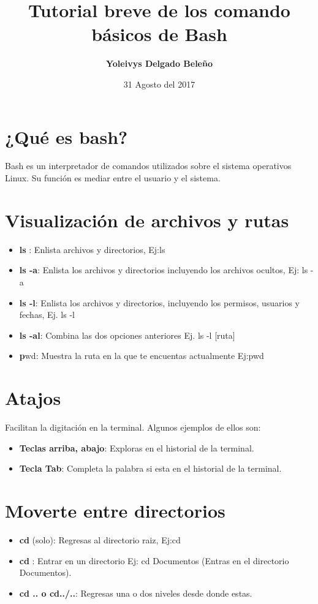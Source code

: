 \documentclass[12pt,a4paper]{article}
\author{\textbf{Yoleivys Delgado Beleño}}
\date{31 Agosto del 2017}
\title{\textbf{Tutorial breve de los comando básicos de Bash}}
\begin{document}
\maketitle



\section{¿Qué es bash?}
Bash es un interpretador de comandos utilizados sobre el sistema operativos Linux. Su función es mediar entre el usuario y el sistema.

\section{Visualización de archivos y rutas}
\begin{itemize}
\item{\textbf{ls} }: Enlista  archivos y directorios, Ej:ls
\item{\textbf{ls -a}}: Enlista los archivos y directorios incluyendo los archivos ocultos, Ej: ls -a
\item{\textbf{ls -l}}: Enlista los archivos y directorios, incluyendo los permisos, usuarios y fechas, Ej. ls -l
\item{\textbf{ls -al}}: Combina las dos opciones anteriores Ej. ls -l [ruta]
\item {\textbf pwd}: Muestra la ruta  en la que te encuentas actualmente Ej:pwd
\end{itemize}

\section{ Atajos}
Facilitan la digitación en la terminal. Algunos ejemplos de ellos son:

\begin{itemize}
\item \textbf{Teclas arriba, abajo}: Exploras en el historial de la terminal.
\item\textbf{Tecla Tab}: Completa la palabra si esta en el historial de la terminal.
\end{itemize}


\section{Moverte entre directorios}
\begin{itemize}
\item \textbf{cd} (solo): Regresas al directorio raiz, Ej:cd
\item \textbf{cd} : Entrar en un directorio Ej: cd Documentos (Entras en el directorio Documentos).
\item \textbf{cd .. o cd../..}: Regresas una o dos niveles desde donde estas.
\end{itemize}
\end{document}
